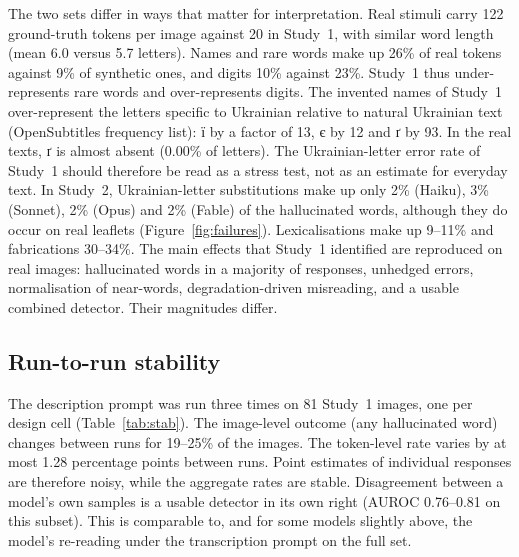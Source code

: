 \documentclass[pdflatex,sn-mathphys-num]{sn-jnl}%
\theoremstyle{thmstyleone}%
\theoremstyle{thmstyletwo}%
\theoremstyle{thmstylethree}%
\newcommand{\OverGhe}{93}
\newcommand{\OverYe}{12}
\newcommand{\OverYi}{13}
\newcommand{\RealGheShare}{0.00}
\newcommand{\RealNameShare}{26}
\newcommand{\RealNumShare}{10}
\newcommand{\RealRangeSubFab}{30--34}
\newcommand{\RealRangeSubLex}{9--11}
\newcommand{\RealSubUaFable}{2}
\newcommand{\RealSubUaHaiku}{2}
\newcommand{\RealSubUaOpus}{2}
\newcommand{\RealSubUaSonnet}{3}
\newcommand{\RealTokLen}{6.0}
\newcommand{\RealTokPerImg}{122}
\newcommand{\StabDisAucRange}{0.76--0.81}
\newcommand{\StabFlipRange}{19--25}
\newcommand{\StabN}{81}
\newcommand{\StabSpreadMax}{1.28}
\newcommand{\SynNameShare}{9}
\newcommand{\SynNumShare}{23}
\newcommand{\SynTokLen}{5.7}
\newcommand{\SynTokPerImg}{20}
\begin{document}
The two sets differ in ways that matter for interpretation. Real stimuli carry \RealTokPerImg{} ground-truth tokens per image against \SynTokPerImg{} in Study~1, with similar word length (mean \RealTokLen{} versus \SynTokLen{} letters). Names and rare words make up \RealNameShare\% of real tokens against \SynNameShare\% of synthetic ones, and digits \RealNumShare\% against \SynNumShare\%. Study~1 thus under-represents rare words and over-represents digits. The invented names of Study~1 over-represent the letters specific to Ukrainian relative to natural Ukrainian text (OpenSubtitles frequency list): \foreignlanguage{ukrainian}{ї} by a factor of \OverYi, \foreignlanguage{ukrainian}{є} by \OverYe{} and \foreignlanguage{ukrainian}{ґ} by \OverGhe. In the real texts, \foreignlanguage{ukrainian}{ґ} is almost absent (\RealGheShare\% of letters). The Ukrainian-letter error rate of Study~1 should therefore be read as a stress test, not as an estimate for everyday text. In Study~2, Ukrainian-letter substitutions make up only \RealSubUaHaiku\% (Haiku), \RealSubUaSonnet\% (Sonnet), \RealSubUaOpus\% (Opus) and \RealSubUaFable\% (Fable) of the hallucinated words, although they do occur on real leaflets (Figure~\ref{fig:failures}). Lexicalisations make up \RealRangeSubLex\% and fabrications \RealRangeSubFab\%. The main effects that Study~1 identified are reproduced on real images: hallucinated words in a majority of responses, unhedged errors, normalisation of near-words, degradation-driven misreading, and a usable combined detector. Their magnitudes differ.

\subsection{Run-to-run stability}\label{sec:stability}

The description prompt was run three times on \StabN{} Study~1 images, one per design cell (Table~\ref{tab:stab}). The image-level outcome (any hallucinated word) changes between runs for \StabFlipRange\% of the images. The token-level rate varies by at most \StabSpreadMax{} percentage points between runs. Point estimates of individual responses are therefore noisy, while the aggregate rates are stable. Disagreement between a model's own samples is a usable detector in its own right (AUROC \StabDisAucRange{} on this subset). This is comparable to, and for some models slightly above, the model's re-reading under the transcription prompt on the full set.
\end{document}

